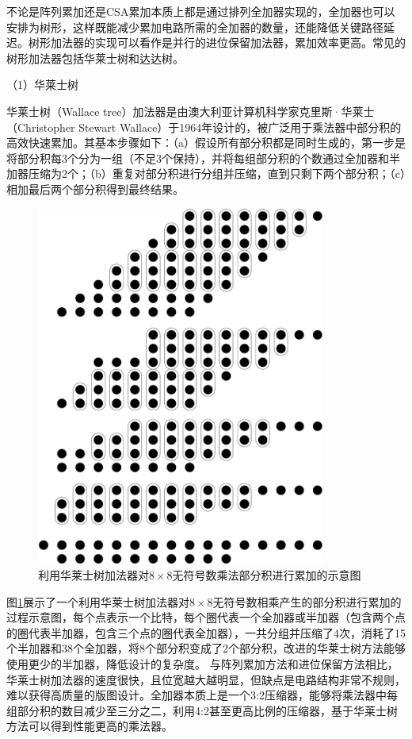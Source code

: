 不论是阵列累加还是CSA累加本质上都是通过排列全加器实现的，全加器也可以安排为树形，这样既能减少累加电路所需的全加器的数量，还能降低关键路径延迟。树形加法器的实现可以看作是并行的进位保留加法器，累加效率更高。常见的树形加法器包括华莱士树\cite{EM:Wallace}和达达树\cite{EM:Dadda}。

（1）华莱士树 \label{华莱士树}

华莱士树（Wallace tree）加法器\cite{EM:Wallace}是由澳大利亚计算机科学家克里斯·华莱士（Christopher Stewart Wallace）于1964年设计的，被广泛用于乘法器中部分积的高效快速累加。其基本步骤如下：（a）假设所有部分积都是同时生成的，第一步是将部分积每3个分为一组（不足3个保持），并将每组部分积的个数通过全加器和半加器压缩为2个；（b）重复对部分积进行分组并压缩，直到只剩下两个部分积；（c）相加最后两个部分积得到最终结果。
\begin{figure}[!htb]
    \centering
    \includegraphics[width=0.85\textwidth]{figs/EM-wallace.pdf}
    \caption{利用华莱士树加法器对$8 \times 8$无符号数乘法部分积进行累加的示意图}
    \label{EM:Fig:wallace}
\end{figure}
图\ref{EM:Fig:wallace}展示了一个利用华莱士树加法器对$8 \times 8$无符号数相乘产生的部分积进行累加的过程示意图，每个点表示一个比特，每个圈代表一个全加器或半加器（包含两个点的圈代表半加器，包含三个点的圈代表全加器），一共分组并压缩了4次，消耗了15个半加器和38个全加器，将8个部分积变成了2个部分积，改进的华莱士树方法能够使用更少的半加器，降低设计的复杂度\cite{EM:redeuce_wallace}。
与阵列累加方法和进位保留方法相比，华莱士树加法器的速度很快，且位宽越大越明显，但缺点是电路结构非常不规则，难以获得高质量的版图设计。全加器本质上是一个3:2压缩器，能够将乘法器中每组部分积的数目减少至三分之二，利用4:2甚至更高比例的压缩器，基于华莱士树方法可以得到性能更高的乘法器\cite{EM:wallace_42}。


